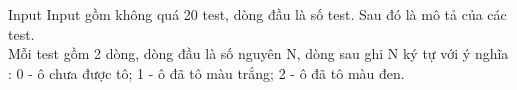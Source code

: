 Input
Input gồm không quá 20 test, dòng đầu là số test. Sau đó là mô tả của các test.   
\\   Mỗi test gồm 2 dòng, dòng đầu là số nguyên N, dòng sau ghi N ký tự với ý nghĩa : 0 - ô chưa được tô; 1 - ô đã tô màu trắng; 2 - ô đã tô màu đen.